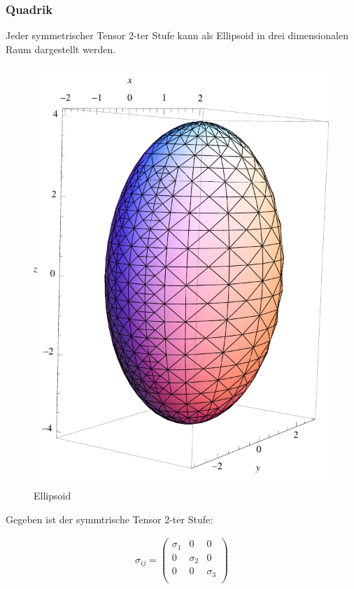 \documentclass[a4paper, 10pt]{scrartcl}
\begin{document}
\subsubsection{Quadrik}
Jeder symmetrischer Tensor 2-ter Stufe kann als Ellipsoid in drei dimensionalen
Raum dargestellt werden.

\begin{figure}[h]
	\begin{center}
		\includegraphics[scale=0.5]{images/ellipsoid.pdf}
		\caption{Ellipsoid}
		\label{fig:ellipsoid}
	\end{center}
\end{figure}

Gegeben ist der symmtrische Tensor 2-ter Stufe:

\begin{align}
	\sigma_{ij}=\begin{pmatrix}
		\sigma_1 & 0 & 0 \\
		0 & \sigma_2 & 0 \\
		0 & 0 & \sigma_3 \\
	\end{pmatrix}
\end{align}
\end{document}

